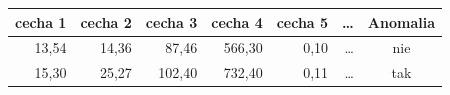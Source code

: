 \begin{tabular}{rrrrrrc}
\toprule
cecha 1 & cecha 2 & cecha 3 & cecha 4 & cecha 5 & \dots & Anomalia \\
\midrule
13,54 & 14,36 & 87,46 & 566,30 & 0,10 & \dots & nie \\
15,30 & 25,27 & 102,40 & 732,40 & 0,11 & \dots & tak \\
\bottomrule
\end{tabular}
